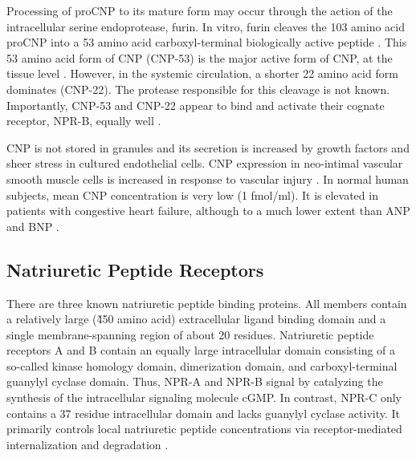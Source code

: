 \documentclass[14pt,a4paper,onecolumn]{extarticle}
\begin{document}
Processing of proCNP to its mature form may occur through the action of the intracellular serine endoprotease, furin. In vitro, furin cleaves the 103 amino acid proCNP into a 53 amino acid carboxyl-terminal biologically active peptide \citep{Wu2003a}. This 53 amino acid form of CNP (CNP-53) is the major active form of CNP, at the tissue level \citep{Brown1997}. However, in the systemic circulation, a shorter 22 amino acid form dominates (CNP-22). The protease responsible for this cleavage is not known. Importantly, CNP-53 and CNP-22 appear to bind and activate their cognate receptor, NPR-B, equally well \citep{Yeung1996}.

CNP is not stored in granules and its secretion is increased by growth factors \citep{Suga1993} \citep{Suga1992b} and sheer stress \citep{Chun1997} in cultured endothelial cells. CNP expression in neo-intimal vascular smooth muscle cells is increased in response to vascular injury \citep{Brown1997}. In normal human subjects, mean CNP concentration is very low (1 fmol/ml). It is elevated in patients with congestive heart failure, although to a much lower extent than ANP and BNP \citep{Charles2006} \citep{Del-Ry2005} \citep{Kalra2003}.

\subsection{Natriuretic Peptide Receptors}
There are three known natriuretic peptide binding proteins. All members contain a relatively large (\~450 amino acid) extracellular ligand binding domain and a single membrane-spanning region of about 20 residues. Natriuretic peptide receptors A and B contain an equally large intracellular domain consisting of a so-called kinase homology domain, dimerization domain, and carboxyl-terminal guanylyl cyclase domain. Thus, NPR-A and NPR-B signal by catalyzing the synthesis of the intracellular signaling molecule cGMP. In contrast, NPR-C only contains a 37 residue intracellular domain and lacks guanylyl cyclase activity. It primarily controls local natriuretic peptide concentrations via receptor-mediated internalization and degradation \citep{Rose2008}.
\end{document}
